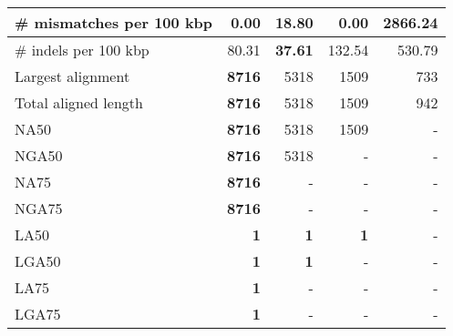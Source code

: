 \documentclass[12pt,a4paper]{article}
\begin{document}
\begin{table}[ht]
\begin{center}
\begin{tabular}{|l*{4}{|r}|}
\# mismatches per 100 kbp & {\bf 0.00} & 18.80 & {\bf 0.00} & 2866.24 \\ \hline
\# indels per 100 kbp & 80.31 & {\bf 37.61} & 132.54 & 530.79 \\ \hline
Largest alignment & {\bf 8716} & 5318 & 1509 & 733 \\ \hline
Total aligned length & {\bf 8716} & 5318 & 1509 & 942 \\ \hline
NA50 & {\bf 8716} & 5318 & 1509 & - \\ \hline
NGA50 & {\bf 8716} & 5318 & - & - \\ \hline
NA75 & {\bf 8716} & - & - & - \\ \hline
NGA75 & {\bf 8716} & - & - & - \\ \hline
LA50 & {\bf 1} & {\bf 1} & {\bf 1} & - \\ \hline
LGA50 & {\bf 1} & {\bf 1} & - & - \\ \hline
LA75 & {\bf 1} & - & - & - \\ \hline
LGA75 & {\bf 1} & - & - & - \\ \hline
\end{tabular}
\end{center}
\end{table}
\end{document}
